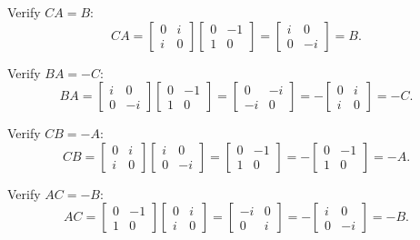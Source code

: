 \documentclass[12pt]{amsart}
\theoremstyle{definition}
\numberwithin{equation}{section}
\begin{document}
\begin{exercise}{6}
    \noindent Verify \(CA = B\):
    \[
    CA = \begin{bmatrix} 0 & i \\ i & 0 \end{bmatrix} \begin{bmatrix} 0 & -1 \\ 1 & 0 \end{bmatrix} = \begin{bmatrix} i & 0 \\ 0 & -i \end{bmatrix} = B.
    \]

    \noindent Verify \(BA = -C\):
    \[
    BA = \begin{bmatrix} i & 0 \\ 0 & -i \end{bmatrix} \begin{bmatrix} 0 & -1 \\ 1 & 0 \end{bmatrix} = \begin{bmatrix} 0 & -i \\ -i & 0 \end{bmatrix} = -\begin{bmatrix} 0 & i \\ i & 0 \end{bmatrix} = -C.
    \]

    \noindent Verify \(CB = -A\):
    \[
    CB = \begin{bmatrix} 0 & i \\ i & 0 \end{bmatrix} \begin{bmatrix} i & 0 \\ 0 & -i \end{bmatrix} = \begin{bmatrix} 0 & -1 \\ 1 & 0 \end{bmatrix} = -\begin{bmatrix} 0 & -1 \\ 1 & 0 \end{bmatrix} = -A.
    \]

    \noindent Verify \(AC = -B\):
    \[
    AC = \begin{bmatrix} 0 & -1 \\ 1 & 0 \end{bmatrix} \begin{bmatrix} 0 & i \\ i & 0 \end{bmatrix} = \begin{bmatrix} -i & 0 \\ 0 & i \end{bmatrix} = -\begin{bmatrix} i & 0 \\ 0 & -i \end{bmatrix} = -B.
    \]


\end{exercise}
\end{document}
